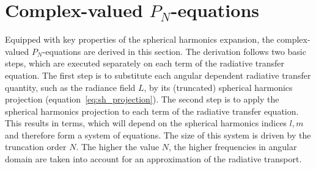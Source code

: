 \section{Complex-valued $P_N$-equations}
\label{sec:pn_cvalued}

Equipped with key properties of the spherical harmonics expansion, the complex-valued $P_N$-equations are derived in this section. The derivation follows two basic steps, which are executed separately on each term of the radiative transfer equation. The first step is to substitute each angular dependent radiative transfer quantity, such as the radiance field $L$, by its (truncated) spherical harmonics projection (equation~\ref{eq:sh_projection}). The second step is to apply the spherical harmonics projection to each term of the radiative transfer equation. This results in terms, which will depend on the spherical harmonics indices $l,m$ and therefore form a system of equations. The size of this system is driven by the truncation order $N$. The higher the value $N$, the higher frequencies in angular domain are taken into account for an approximation of the radiative transport.
